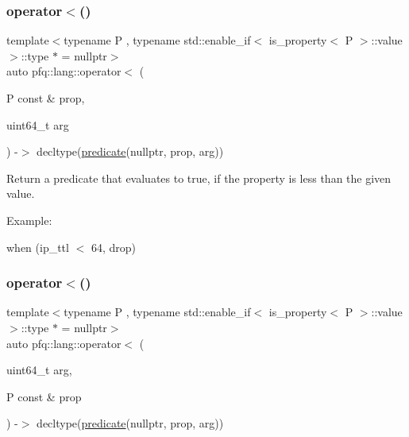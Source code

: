 \subsubsection{\texorpdfstring{operator$<$()}{operator<()}\hspace{0.1cm}{\footnotesize\ttfamily [1/2]}}
{\footnotesize\ttfamily template$<$typename P , typename std\+::enable\+\_\+if$<$ is\+\_\+property$<$ P $>$\+::value $>$\+::type $\ast$  = nullptr$>$ \\
auto pfq\+::lang\+::operator$<$ (\begin{DoxyParamCaption}\item[{P const \&}]{prop,  }\item[{uint64\+\_\+t}]{arg }\end{DoxyParamCaption}) -\/$>$ decltype(\hyperlink{namespacepfq_1_1lang_aca9adafc436b7f851621b979fa1aaf88}{predicate}(nullptr, prop, arg))
    \hspace{0.3cm}{\ttfamily [inline]}}



Return a predicate that evaluates to {\ttfamily true}, if the property is less than the given value. 

Example\+:

when (ip\+\_\+ttl $<$ 64, drop) \mbox{\label{namespacepfq_1_1lang_aff17190c67c14754515551bc27f056da}} 
\subsubsection{\texorpdfstring{operator$<$()}{operator<()}\hspace{0.1cm}{\footnotesize\ttfamily [2/2]}}
{\footnotesize\ttfamily template$<$typename P , typename std\+::enable\+\_\+if$<$ is\+\_\+property$<$ P $>$\+::value $>$\+::type $\ast$  = nullptr$>$ \\
auto pfq\+::lang\+::operator$<$ (\begin{DoxyParamCaption}\item[{uint64\+\_\+t}]{arg,  }\item[{P const \&}]{prop }\end{DoxyParamCaption}) -\/$>$ decltype(\hyperlink{namespacepfq_1_1lang_aca9adafc436b7f851621b979fa1aaf88}{predicate}(nullptr, prop, arg))
    \hspace{0.3cm}{\ttfamily [inline]}}

\mbox{\label{namespacepfq_1_1lang_a039a937311f139f9a6e84c49c6505c70}} 
